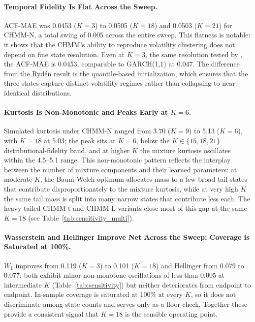 \paragraph{Temporal Fidelity Is Flat Across the Sweep.}
ACF-MAE was 0.0453 ($K=3$) to 0.0505 ($K=18$) and 0.0503 ($K=21$) for CHMM-N, a total swing of 0.005 across the entire sweep.
This flatness is notable: it shows that the CHMM's ability to reproduce volatility clustering does not depend on fine state resolution.
Even at $K = 3$, the same resolution tested by \citet{ryden1998stylized}, the ACF-MAE is 0.0453, comparable to GARCH(1,1) at 0.047.
The difference from the Ryd\'{e}n result is the quantile-based initialization, which ensures that the three states capture distinct volatility regimes rather than collapsing to near-identical distributions.

\paragraph{Kurtosis Is Non-Monotonic and Peaks Early at $K = 6$.}
Simulated kurtosis under CHMM-N ranged from 3.70 ($K=9$) to 5.13 ($K=6$), with $K=18$ at 5.03; the peak sits at $K = 6$, below the $K \in \{15, 18, 21\}$ distributional-fidelity band, and at higher $K$ the mixture kurtosis oscillates within the 4.5--5.1 range.
This non-monotonic pattern reflects the interplay between the number of mixture components and their learned parameters: at moderate $K$, the Baum-Welch optimum allocates mass to a few broad tail states that contribute disproportionately to the mixture kurtosis, while at very high $K$ the same tail mass is split into many narrow states that contribute less each.
The heavy-tailed CHMM-t and CHMM-L variants close most of this gap at the same $K = 18$ (see Table~\ref{tab:sensitivity_multi}).

\paragraph{Wasserstein and Hellinger Improve Net Across the Sweep; Coverage is Saturated at 100\%.}
$W_1$ improves from 0.119 ($K=3$) to 0.101 ($K=18$) and Hellinger from 0.079 to 0.077; both exhibit minor non-monotone oscillations of less than $0.005$ at intermediate $K$ (Table~\ref{tab:sensitivity}) but neither deteriorates from endpoint to endpoint.
In-sample coverage is saturated at 100\% at every $K$, so it does not discriminate among state counts and serves only as a floor check.
Together these provide a consistent signal that $K = 18$ is the sensible operating point.

